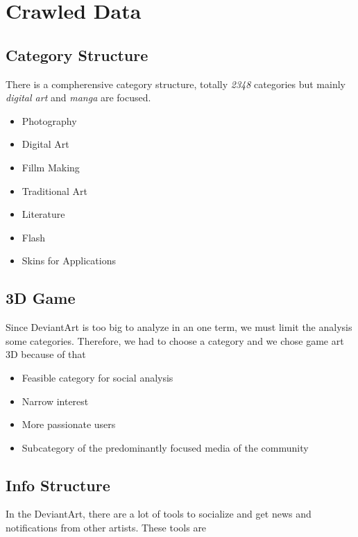 \documentclass[12pt,a4paper]{report}
\begin{document}
\chapter{Crawled Data}

	\section{Category Structure}

	\par \hspace{0.6cm} There is a compherensive category structure, totally \emph{2348} categories but mainly \emph{digital art} and \emph{manga} are focused.

	\begin{itemize}
	\item Photography
	\item Digital Art
	\item Fillm Making
	\item Traditional Art
	\item Literature
	\item Flash
	\item Skins for Applications
	\end{itemize}

	\section{3D Game}

	\par \hspace{0.6cm} Since DeviantArt is too big to analyze in an one term, we must limit the analysis some categories. Therefore, we had to choose a category and we chose game art 3D because of that

	\begin{itemize}
	\item Feasible category for social analysis
	\item Narrow interest
	\item More passionate users
	\item Subcategory of the predominantly focused media of the community
	\end{itemize}

	\section{Info Structure}

	\par \hspace{0.6cm} In the DeviantArt, there are a lot of tools to socialize and get news and notifications from other artists. These tools are 
\end{document}

